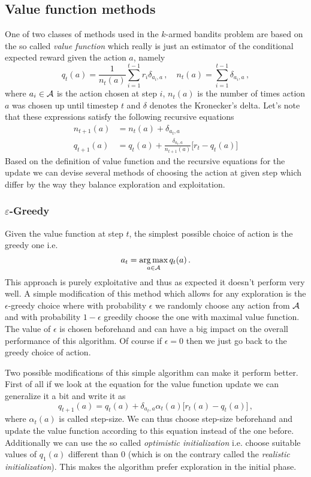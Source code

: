 \documentclass{myclass}
\begin{document}
\subsection{Value function methods}

One of two classes of methods used in the $k$-armed bandits problem are based on the so called
\emph{value function} which really is just an estimator of the conditional expected reward given the
action $a$, namely
\[
    q_t(a) = \frac{1}{n_t(a)} \sum_{i=1}^{t-1} r_i \delta_{a_i,a}\,,\quad n_t(a) = \sum_{i=1}^{t-1} \delta_{a_i,a}\,,
\]
where $a_i \in \mathcal{A}$ is the action chosen at step $i$, $n_t(a)$ is the number of times action $a$
was chosen up until timestep $t$ and $\delta$ denotes the Kronecker's delta. Let's note that these
expressions satisfy the following recursive equations
\[
\boxed
{
\begin{split}
    n_{t+1}(a) &= n_{t}(a) + \delta_{a_t,a}\\
    q_{t+1}(a) &= q_t(a) + \frac{\delta_{a_t, a}}{n_{t+1}(a)}\big[ r_t  - q_t(a) \big]
\end{split}
}
\]
Based on the definition of value function and the recursive equations for the update we can devise
several methods of choosing the action at given step which differ by the way they balance
exploration and exploitation.

\subsubsection{$\varepsilon$-Greedy}

Given the value function at step $t$, the simplest possible choice of action is the greedy one i.e.
\[
    a_t = \operatorname*{arg\,max}_{a \in \mathcal{A}} q_t(a)\,.
\]
This approach is purely exploitative and thus as expected it doesn't perform very well. A simple
modification of this method which allows for any exploration is the $\epsilon$-greedy choice where
with probability $\epsilon$ we randomly choose any action from $\mathcal{A}$ and with probability
$1-\epsilon$ greedily choose the one with maximal value function. The value of $\epsilon$ is chosen
beforehand and can have a big impact on the overall performance of this algorithm. Of course if
$\epsilon = 0$ then we just go back to the greedy choice of action.

Two possible modifications of this simple algorithm can make it perform better. First of all if we
look at the equation for the value function update we can generalize it a bit and write it as
\[
    q_{t+1}(a) = q_{t}(a) + \delta_{a_t,a} \alpha_t(a) \big[ r_t(a) - q_t(a) \big]\,,
\]
where $\alpha_t(a)$ is called step-size. We can thus choose step-size beforehand and update the
value function according to this equation instead of the one before. Additionally we can use the so
called \emph{optimistic initialization} i.e. choose suitable values of $q_1(a)$ different than 0
(which is on the contrary called the \emph{realistic initialization}). This makes the algorithm
prefer exploration in the initial phase.
\end{document}
